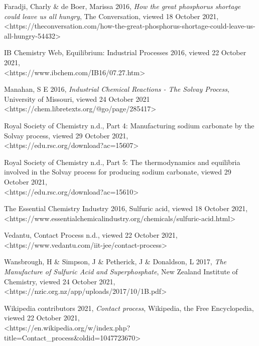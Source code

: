 \documentclass[12pt, a4paper]{article}
\begin{document}
Faradji, Charly \& de Boer, Marissa 2016, \emph{How the great phosphorus shortage could leave us all hungry}, The Conversation, viewed 18 October 2021, \\ \textless{https://theconversation.com/how-the-great-phosphorus-shortage-could-leave-us-all-hungry-54432}\textgreater

IB Chemistry Web, Equilibrium: Industrial Processes 2016, viewed 22 October 2021, \\ \textless{https://www.ibchem.com/IB16/07.27.htm}\textgreater

Manahan, S E 2016, \emph{Industrial Chemical Reactions - The Solvay Process}, University of Missouri, viewed 24 October 2021 \\ \textless{https://chem.libretexts.org/@go/page/285417}\textgreater

Royal Society of Chemistry n.d., Part 4: Manufacturing sodium carbonate by the Solvay process, viewed 29 October 2021, \\ \textless{https://edu.rsc.org/download?ac=15607}\textgreater

Royal Society of Chemistry n.d., Part 5: The thermodynamics and equilibria involved in the Solvay process for producing sodium carbonate, viewed 29 October 2021, \\ \textless{https://edu.rsc.org/download?ac=15610}\textgreater

The Essential Chemistry Industry 2016, Sulfuric acid, viewed 18 October 2021, \\ \textless{https://www.essentialchemicalindustry.org/chemicals/sulfuric-acid.html}\textgreater

Vedantu, Contact Process n.d., viewed 22 October 2021, \\ \textless{https://www.vedantu.com/iit-jee/contact-process}\textgreater

Wansbrough, H \& Simpson, J \& Petherick, J \& Donaldson, L 2017, \emph{The Manufacture of Sulfuric Acid and Superphosphate}, New Zealand Institute of Chemistry, viewed 24 October 2021, \\ \textless{https://nzic.org.nz/app/uploads/2017/10/1B.pdf}\textgreater

Wikipedia contributors 2021, \emph{Contact process}, Wikipedia, the Free Encyclopedia, viewed 22 October 2021, \\ \textless{https://en.wikipedia.org/w/index.php?title=Contact\_process\&oldid=1047723670}\textgreater
\end{document}
